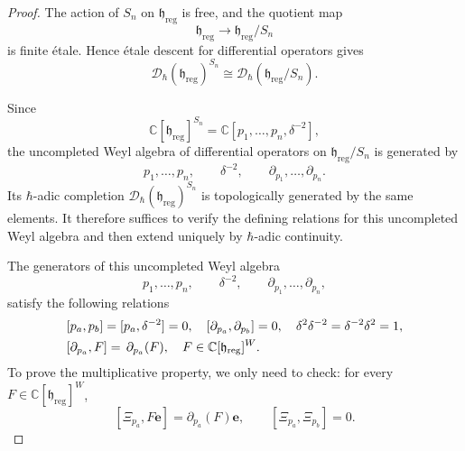\documentclass[11pt,reqno]{amsart}
\theoremstyle{definition}
\newcommand{\bbC}{\mathbb{C}}
\newcommand{\be}{\mathbf{e}}
\newcommand{\mD}{\mathcal{D}}
\newcommand{\fkh}{\mathfrak{h}}
\newcommand{\reg}{\mathrm{reg}}
\begin{document}
\begin{proof}
	The action of \(S_n\) on \(\fkh_{\reg}\) is free, and the quotient map
\[
\fkh_{\reg}\longrightarrow\fkh_{\reg}/S_n
\]
is finite \'etale. Hence \'etale descent for
differential operators gives
\[
\mD_\hbar(\fkh_{\reg})^{S_n}
\cong
\mD_\hbar(\fkh_{\reg}/S_n).
\]


Since
\[
\bbC[\fkh_{\reg}]^{S_n}
=
\bbC[p_1,\ldots,p_n,\delta^{-2}],
\]
	the uncompleted Weyl algebra of differential operators on
	\(\fkh_{\reg}/S_n\) is generated by
\[
p_1,\ldots,p_n,
\qquad
\delta^{-2},
\qquad
\partial_{p_1},\ldots,\partial_{p_n}.
\]
Its \(\hbar\)-adic completion
\(\mD_\hbar(\fkh_{\reg})^{S_n}\) is topologically generated by the same elements.
It therefore suffices to verify the defining relations for
this uncompleted Weyl algebra and then extend uniquely by
\(\hbar\)-adic continuity.


The generators of this uncompleted Weyl algebra
\[
p_1,\ldots,p_n,
\qquad
\delta^{-2},
\qquad
\partial_{p_1},\ldots,\partial_{p_n},
\]
 satisfy the following relations
	\begin{equation}\label{eq:power-sum-differential-relations}
	\begin{aligned}&
	\relax [p_a,p_b]=[p_a, \delta^{-2}]=0,\quad
	[\partial_{p_a},\partial_{p_b}]=0,
	\quad \delta^2 \delta^{-2} = \delta^{-2} \delta^{2} = 1,
	\\
	& [\partial_{p_a},F]
	  =\,\partial_{p_a}(F),
	  \quad
	  F\in\bbC[\fkh_{\reg}]^W.
	\end{aligned}
	\end{equation}
	To prove the multiplicative property, 
	we only need to check: for every
	\(F\in\bbC[\fkh_{\reg}]^W\),
	\begin{equation}\label{eq:Cherednik-power-sum-Weyl-relation}
	  [ \Xi_{p_a} ,F \be]
	  =
	  \partial_{p_a}(F) \be,
	  \qquad
	  [ \Xi_{p_a} ,\Xi_{p_b}]
	  =
	  0.
	\end{equation}
	

\end{proof}
\end{document}
